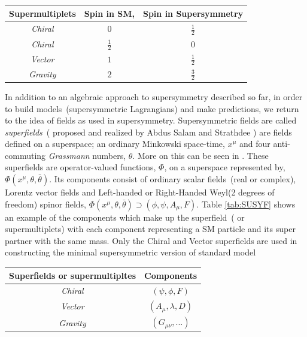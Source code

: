 \begin{center}
\centering
\begin{tabular}{|c |c|c|}
\hline
\bfseries{Supermultiplets} & \bfseries {Spin in SM}, & \bfseries{Spin in Supersymmetry}\\
\hline \hline

\textit{Chiral} & $0$ & $\frac{1}{2}$ \\ 
\textit{Chiral} &$\frac{1}{2}$ & $0$ \\   \hline
\textit{Vector} & $1$ & $\frac{1}{2} $ \\ \hline
\textit{Gravity} & $2$ & $\frac{3}{2} $ \\

\hline \hline
\end{tabular}
\label{tab:SUSYM} 
\end{center}



In addition to an algebraic approach to supersymmetry described so far, in order to build models~(supersymmetric Lagrangians) and make predictions, we return to the idea of fields as used in supersymmetry. Supersymmetric fields are called \textit{superfields}~( proposed and realized by Abdus Salam and Strathdee \cite{SALAM, SUSYBOOK}) are fields defined on a superspace; an ordinary Minkowski space-time, $x^{\mu}$ and four anti-commuting \textit{Grassmann} numbers, $\theta$. More on this can be seen in  \cite{SUSYBOOK}.
These superfields are operator-valued functions, \textbf{$\Phi$}, on a superspace represented by, \textbf{$\Phi\left(x^{\mu},\theta,\bar{\theta}\right)$}.
Its components consist of ordinary scalar fields~(real or complex), Lorentz vector fields and Left-handed or Right-Handed Weyl(2 degrees of freedom) spinor fields, \textbf{$\Phi\left(x^{\mu},\theta,\bar{\theta}\right) \supset (\phi, \psi, A_{\mu}, F)$}.
Table \ref{tab:SUSYF} shows an example of the components which make up the  superfield~( or supermultiplets) with each component representing a SM particle and its super partner with the same mass. Only the Chiral and Vector  superfields are used in constructing the minimal supersymmetric version of standard model

\begin{center}
\centering
\begin{tabular}{|c| c|}
\hline
\bfseries{Superfields or supermultipltes } & \bfseries {Components}\\
\hline
\textit{Chiral} & $(\psi, \phi, F)$ \\
\textit{Vector} & $(A_{\mu},\lambda, D)$ \\
\textit{Gravity} & $ (G_{\mu\nu}, ... ) $ \\

\hline \hline
\end{tabular}
\label{tab:SUSYF} 
\end{center}

